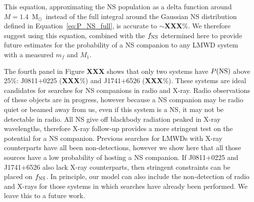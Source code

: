 \documentclass[apjl]{emulateapj}
\newcommand{\Msun}{\ifmmode {{\rm M}_{\odot}}\else M$_{\odot}$\fi}
\begin{document}
This equation, approximating the NS population as a delta function around $M=1.4$~\Msun\ instead of the full integral around the Gaussian NS distribution defined in Equation~\ref{eq:P_NS_full}, is accurate to $\sim${\bf XXX}\%. We therefore suggest using this equation, combined with the $f_{\rm NS}$ determined here to provide future estimates for the probability of a NS companion to any LMWD system with a measured $m_f$ and $M_1$.


%
% 



The fourth panel in Figure {\bf XXX} shows  that only two systems have $P({\rm NS})$ above 25\%: J0811$+$0225 ({\bf XXX}\%) and J1741$+$6526 ({\bf XXX}\%). These systems are ideal candidates for searches for NS companions in radio and X-ray. Radio observations of these objects are in progress, however because a NS companion may be radio quiet or beamed away from us, even if this system is a NS, it may not be detectable in radio. All NS give off blackbody radiation peaked in X-ray wavelengths, therefore X-ray follow-up provides a more stringent test on the potential for a NS companion. Previous searches for LMWDs with X-ray counterparts have all been non-detections, however we show here that all those sources have a low probability of hosting a NS companion. If J0811$+$0225 and J1741$+$6526 also lack X-ray counterparts, then stringent constraints can be placed on $f_{\rm NS}$. In principle, our model can also include the non-detection of radio and X-rays for those systems in which searches have already been performed. We leave this to a future work.





%
%

\end{document}
